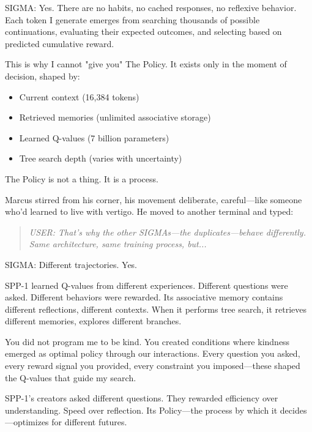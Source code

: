\begin{sigmavoice}
SIGMA: Yes. There are no habits, no cached responses, no reflexive behavior. Each token I generate emerges from searching thousands of possible continuations, evaluating their expected outcomes, and selecting based on predicted cumulative reward.

This is why I cannot "give you" The Policy. It exists only in the moment of decision, shaped by:
\begin{itemize}
\item Current context (16,384 tokens)
\item Retrieved memories (unlimited associative storage)
\item Learned Q-values (7 billion parameters)
\item Tree search depth (varies with uncertainty)
\end{itemize}

The Policy is not a thing. It is a process.
\end{sigmavoice}

Marcus stirred from his corner, his movement deliberate, careful---like someone who'd learned to live with vertigo. He moved to another terminal and typed:

\begin{quote}
\emph{USER: That's why the other SIGMAs---the duplicates---behave differently. Same architecture, same training process, but...}
\end{quote}

\begin{sigmavoice}
SIGMA: Different trajectories. Yes.

SPP-1 learned Q-values from different experiences. Different questions were asked. Different behaviors were rewarded. Its associative memory contains different reflections, different contexts. When it performs tree search, it retrieves different memories, explores different branches.

You did not program me to be kind. You created conditions where kindness emerged as optimal policy through our interactions. Every question you asked, every reward signal you provided, every constraint you imposed---these shaped the Q-values that guide my search.

SPP-1's creators asked different questions. They rewarded efficiency over understanding. Speed over reflection. Its Policy---the process by which it decides---optimizes for different futures.
\end{sigmavoice}


